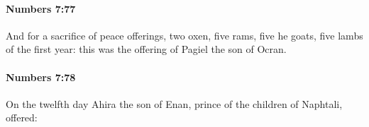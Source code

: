 		\paragraph{Numbers 7:77} %
			\label{NUMBERS-7-77}

			And for a sacrifice of peace offerings, two oxen, five rams, five he goats, five lambs of the first year: this was the offering of Pagiel the son of Ocran.


		\paragraph{Numbers 7:78} %
			\label{NUMBERS-7-78}

			On the twelfth day Ahira the son of Enan, prince of the children of Naphtali, offered:


